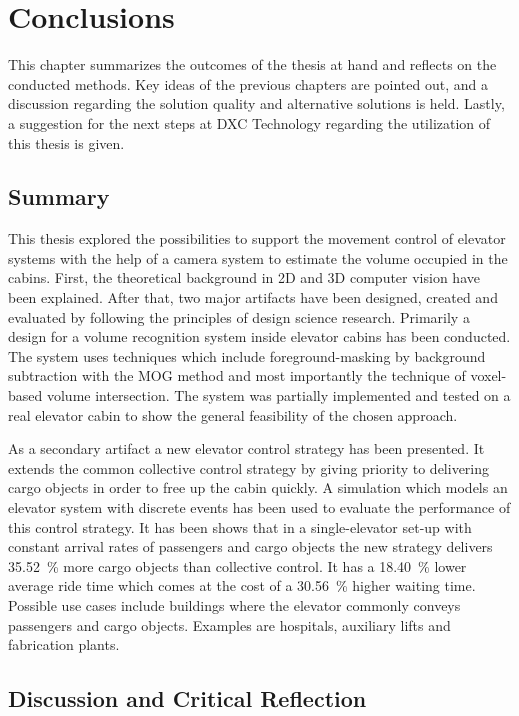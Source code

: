 \chapter{Conclusions}
\label{chap:concl}

This chapter summarizes the outcomes of the thesis at hand 
and reflects on the conducted methods.
Key ideas of the previous chapters are pointed out, and a discussion regarding the solution quality and alternative solutions is held.
Lastly, a suggestion for the next steps at DXC Technology regarding the utilization of this thesis is given.

\section{Summary}

This thesis explored the possibilities to support the movement control of elevator systems with the help of a camera system to estimate the volume occupied in the cabins.
First, the theoretical background in \ac{2D} and \ac{3D} computer vision have been explained.
After that, two major artifacts have been designed, created and evaluated by following the principles of design science research.
Primarily a design for a volume recognition system inside elevator cabins has been conducted.
The system uses techniques which include foreground-masking by background subtraction with the \ac{MOG} method and most importantly the technique of voxel-based volume intersection.
The system was partially implemented and tested on a real elevator cabin to show the general feasibility of the chosen approach.

As a secondary artifact a new elevator control strategy has been presented.
It extends the common collective control strategy by giving priority to delivering cargo objects in order to free up the cabin quickly.
A simulation which models an elevator system with discrete events has been used to evaluate the performance of this control strategy.
It has been shows that in a single-elevator set-up with constant arrival rates of passengers and cargo objects the new strategy delivers 35.52~\% more cargo objects than collective control.
It has a 18.40~\% lower average ride time which comes at the cost of a 30.56~\% higher waiting time.
Possible use cases include buildings where the elevator commonly conveys passengers and cargo objects.
Examples are hospitals, auxiliary lifts and fabrication plants.

\section{Discussion and Critical Reflection}

